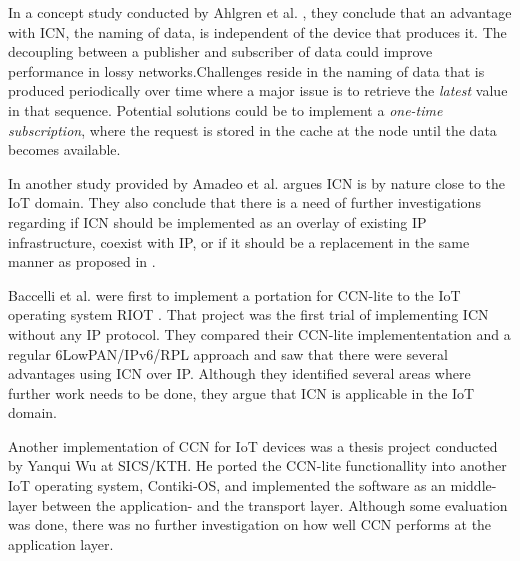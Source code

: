 In a concept study conducted by Ahlgren et al. \cite{Ahlgreniot}, they conclude that an advantage with ICN, the naming of data, is independent of the device that produces it. The decoupling between a publisher and subscriber of data could improve performance in lossy networks.Challenges reside in the naming of data that is produced periodically over time where a major issue is to retrieve the \textit{latest} value in that sequence. Potential solutions could be to implement a \textit{one-time subscription}, where the request is stored in the cache at the node until the data becomes available\cite{Ahlgreniot}. 

In another study provided by Amadeo et al. \cite{iotchop} argues ICN is by nature close to the IoT domain. They also conclude that there is a need of further investigations regarding if ICN should be implemented as an overlay of existing IP infrastructure, coexist with IP, or if it should be a replacement in the same manner as proposed in \cite{Jacobson2009}.

Baccelli et al. were first to implement a portation for CCN-lite to the IoT operating system RIOT \cite{icniotexpinwild}\cite{RIOT}. That project was the first trial of implementing ICN without any IP protocol. They compared their CCN-lite implemententation and a regular 6LowPAN/IPv6/RPL approach and saw that there were several advantages using ICN over IP. Although they identified several areas where further work needs to be done, they argue that ICN is applicable in the IoT domain.

Another implementation of CCN for IoT devices was a thesis project conducted by Yanqui Wu at SICS/KTH\cite{yanqui}. He ported the CCN-lite functionallity into another IoT operating system, Contiki-OS, and implemented the software as an middle-layer between the application- and the transport layer. Although some evaluation was done, there was no further investigation on how well CCN performs at the application layer. \\


